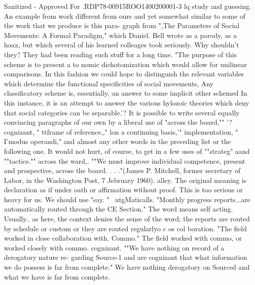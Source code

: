 \documentclass[
    oneside,
    11pt,
    draft
]{memoir}
\begin{document}
Sanitized - Approved For .RDP78-00915ROO1400200001-3 lq study and guessing. An example from work different from ours and yet somewhat similar to some of the work that we produce is this para- graph from ",The Parameters of Social Movements: A Formal Paradigm," which Daniel. Bell wrote as a parody, as a hoax, but which several of his learned colleages took seriously. Why shouldn't they? They had been reading such stuff for a long time. "The purpose of this scheme is to present a to nomic dichotomization which would allow for unilinear comparisons. In this fashion we could hope to distinguish the relevant variables which determine the functional specificities of social movements, Any classificatory scheme is, essentially, an answer to some implicit other schemed In this instance, it is an attempt to answer the various hylozoic theories which deny that social categories can be separable.'? It is possible to write several equally convincing paragraphs of our own by a liberal use of "across the board,"" '?cognizant, " ttframe of reference,," lon a continuing basis,'" implementation, " I'modus operandi," and almost any other words in the preceding list or the following one. It would not hurt, of course, to get in a few uses of ""strateg" aand ""tactics."" across the ward,. ""We must improve individual competence, present and prospective, across the board. . . ."(James P. Mitchell, former secretary of Labor, in the Washington Post, 7 Jebruary 1960). alley. The original meaning is declaration as if under oath or affirmation without proof. This is too serious or heavy for us. We should use "say. " ~utgMaticalls. "Monthly progress reports...are automatically routed through the CE Section." The word means self acting. Usually.. as here, the context denies the sense of the word; the reports are routed by schedule or custom or they are routed regularlyo c os col boration. "The field worked in close collaboration with. Commo." The field worked with commo, or worked closely with commo. cognizant. ""We have nothing on record of a derogatory nature re- garding Source-1 and are cognizant that what information we do possess is far from complete." We have nothing derogatory on Sourced and what we have is far from complete.
\end{document}
